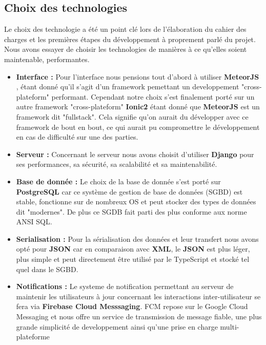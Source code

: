 \documentclass[french]{article}
\begin{document}
		\subsection{Choix des technologies}
		Le choix des technologie a été un point clé lors de l'élaboration du cahier des charges et les premières étapes du développement à proprement parlé du projet.
		Nous avons essayer de choisir les technologies de manières à ce qu'elles soient maintenable, performantes.
		\begin{itemize}
			\item \textbf{Interface :} Pour l'interface nous pensions tout d'abord à utiliser \textbf{MeteorJS} \cite{meteor}, étant donné qu'il s'agit d'un framework pemettant un developpement "cross-plateform" performant. Cependant notre choix s'est finalement porté sur un autre framework "cross-plateform" \textbf{Ionic2} \cite{ionic} étant donné que \textbf{MeteorJS} est un framework dit "fullstack". Cela signifie qu'on aurait du développer avec ce framework de bout en bout, ce qui aurait pu compromettre le développement en cas de difficulté sur une des parties.
			\item \textbf{Serveur :} Concernant le serveur nous avons choisit d'utiliser \textbf{Django} \cite{django}  pour ses performances, sa sécurité, sa scalabilité et sa maintenabilité.
			\item \textbf{Base de donnée :} Le choix de la base de donnée s'est porté sur \textbf{PostgreSQL} car ce système de gestion de base de données (SGBD) est stable, fonctionne sur de nombreux OS et peut stocker des types de données dit "modernes". De plus ce SGDB fait parti des plus conforme aux norme ANSI SQL.
			\item \textbf{Serialisation :} Pour la sérialisation des données et leur transfert nous avons opté pour \textbf{JSON} car en comparaison avec \textbf{XML}, le \textbf{JSON} est plus léger, plus simple et peut directement être utilisé par le TypeScript et stocké tel quel dans le SGBD.
			\item \textbf{Notifications :} Le systeme de notification permettant au serveur de maintenir les utilisateurs à jour concernant les interactions inter-utilisateur se fera via \textbf{Firebase Cloud Messsaging}. FCM  repose sur le Google Cloud Messaging et nous offre un service de transmission de message fiable, une plus grande simplicité de developpement ainsi qu'une prise en charge multi-plateforme 
		\end{itemize}
		
\end{document}
